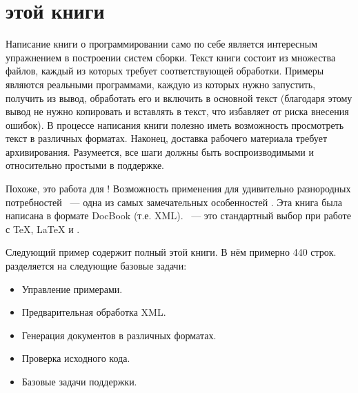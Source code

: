 \section{\Makefile{} этой книги}

Написание книги о программировании само по себе является интересным
упражнением в построении систем сборки. Текст книги состоит из
множества файлов, каждый из которых требует соответствующей
обработки. Примеры являются реальными программами, каждую из которых
нужно запустить, получить из вывод, обработать его и включить в
основной текст (благодаря этому вывод не нужно копировать и вставлять
в текст, что избавляет от риска внесения ошибок). В процессе написания
книги полезно иметь возможность просмотреть текст в различных
форматах. Наконец, доставка рабочего материала требует
архивирования. Разумеется, все шаги должны быть воспроизводимыми и
относительно простыми в поддержке.

Похоже, это работа для \GNUmake{}! Возможность применения для
удивительно разнородных потребностей ~--- одна из самых замечательных
особенностей \GNUmake{}. Эта книга была написана в формате DocBook
(т.е. XML). \GNUmake{}~--- это стандартный выбор при работе с \TeX{},
\LaTeX{} и .

Следующий пример содержит полный \Makefile{} этой книги. В нём
примерно 440 строк. \Makefile{} разделяется на следующие базовые
задачи:

\begin{itemize}
  \item{} Управление примерами.
  \item{} Предварительная обработка XML.
  \item{} Генерация документов в различных форматах.
  \item{} Проверка исходного кода.
  \item{} Базовые задачи поддержки.
\end{itemize}

